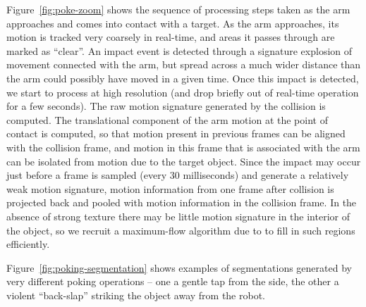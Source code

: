 



Figure~\ref{fig:poke-zoom} shows the sequence of processing steps
taken as the arm approaches and comes into contact with a target.  As
the arm approaches, its motion is tracked very coarsely in real-time,
and areas it passes through are marked as ``clear''.  An impact event
is detected through a signature explosion of movement connected with
the arm, but spread across a much wider distance than the arm could
possibly have moved in a given time.  Once this impact is detected, we
start to process at high resolution (and drop briefly out of real-time
operation for a few seconds).  The raw motion signature generated by
the collision is computed.  The translational component of the arm
motion at the point of contact is computed, so that motion present in
previous frames can be aligned with the collision frame, and motion in
this frame that is associated with the arm can be isolated from motion
due to the target object.  Since the impact may occur just before a
frame is sampled (every 30 milliseconds) and generate a relatively
weak motion signature, motion information from one frame after
collision is projected back and pooled with motion information in the
collision frame.  In the absence of strong texture there may be little motion
signature in the interior of the object, so we recruit a maximum-flow
algorithm due to \cite{boykov01experimental} to fill in such regions
efficiently.

Figure~\ref{fig:poking-segmentation} shows examples of segmentations
generated by very different poking operations -- one a gentle
tap from the side, the other a violent ``back-slap'' striking
the object away from the robot.

